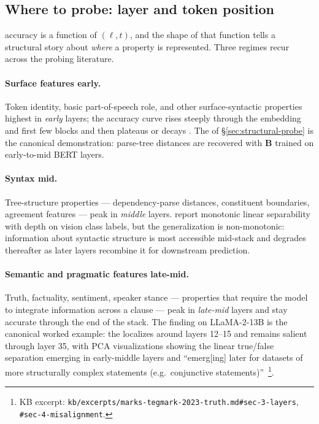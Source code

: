 \subsection{Where to probe: layer and token position}
\label{sec:probe-layer-position}

 accuracy is a function of $(\ell, t)$, and the shape of that
function tells a structural story about \emph{where} a property is
represented. Three regimes recur across the  probing literature.

\paragraph{Surface features early.} Token identity, basic part-of-speech
role, and other surface-syntactic properties  highest in
\emph{early} layers; the  accuracy curve rises steeply through the
embedding and first few  blocks and then plateaus or decays
\citep{hewitt2019-structural-probe}. The  of
\S\ref{sec:structural-probe} is the canonical demonstration: parse-tree
distances are recovered with $\mathbf{B}$ trained on early-to-mid BERT
layers.

\paragraph{Syntax mid.} Tree-structure properties — dependency-parse
distances, constituent boundaries, agreement features — peak in
\emph{middle} layers. \citet{alain-bengio-2017} report monotonic
linear separability with depth on vision class labels, but the 
generalization is non-monotonic: information about syntactic structure
is most accessible mid-stack and degrades thereafter as later layers
recombine it for downstream prediction.

\paragraph{Semantic and pragmatic features late-mid.} Truth, factuality,
sentiment, speaker stance — properties that require the model to
integrate information across a clause — peak in \emph{late-mid} layers
and stay accurate through the end of the stack. The
\citet{marks-tegmark-2023-truth} finding on LLaMA-2-13B is the canonical
worked example: the  localizes around layers 12--15 and
remains salient through layer 35, with PCA visualizations showing the
linear true/false separation emerging in early-middle layers and
``emerg[ing] later for datasets of more structurally complex statements
(e.g.\ conjunctive statements)''~\citep[\S 4]{marks-tegmark-2023-truth}\footnote{KB
excerpt: \nolinkurl{kb/excerpts/marks-tegmark-2023-truth.md#sec-3-layers},
\texttt{\#sec-4-misalignment}.}.

